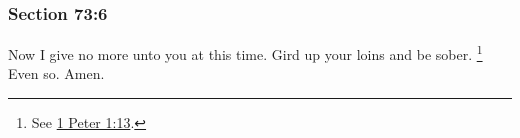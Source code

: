 	\subsubsection{Section 73:6} %
		\label{DC73-6}

		Now I give no more unto you at this time.  Gird up your loins and be sober.%
			\footnote{%
				See \hyperref[1PETER-1-13]{1 Peter 1:13}.
				}
		Even so.  Amen.

